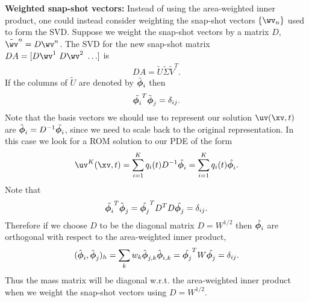 {\bf Weighted snap-shot vectors:} Instead of using the area-weighted inner product, one could instead consider weighting the
snap-shot vectors $\{ \wv_n \}$ used to form the SVD. Suppose we weight the snap-shot vectors by
a matrix $D$, $\tilde{\wv}^n=D\wv^n$. The SVD for the new snap-shot matrix $D A =[ D\wv^1~D\wv^2~\ldots]$ is
\begin{align}
   D A = \tilde{U} \tilde{\Sigma} \tilde{V}^T.
\end{align}
If the columns of $\tilde{U}$ are denoted by $\tilde{\boldsymbol{\phi}}_i$ then 
\begin{align}
   \tilde{\boldsymbol{\phi}_i} ^T \tilde{\boldsymbol{\phi}}_j = \delta_{ij} . 
\end{align}
Note that the basis vectors we should 
use to represent our solution $\uv(\xv,t)$ are $\hat{\boldsymbol{\phi}}_i = D^{-1} \tilde{\boldsymbol{\phi}_i}$,
since we need to scale back to the original representation.
In this case we look for a ROM solution to our PDE of the form
\begin{align}
   \uv^K(\xv,t) = \sum_{i=1}^K q_i(t) D^{-1} \tilde{\phiv_i} = \sum_{i=1}^K q_i(t) \hat{\phiv_i}. 
\end{align}
Note that 
\begin{align}
   \tilde{\boldsymbol{\phi}_i} ^T \tilde{\boldsymbol{\phi}}_j = \hat{\boldsymbol{\phi}_j} ^T D^T D \hat{\boldsymbol{\phi}_j} = \delta_{ij} .
\end{align}
Therefore if we choose $D$ to be the diagonal matrix $D=W^{1/2}$ then $\hat{\boldsymbol{\phi}_i}$ are orthogonal with respect to the area-weighted
inner product,
 \begin{align}
   (\hat{\boldsymbol{\phi}}_i,\hat{\boldsymbol{\phi}}_j)_h = \sum_k w_k \hat{\boldsymbol{\phi}}_{j,k} \hat{\boldsymbol{\phi}}_{i,k} = \hat{\boldsymbol{\phi}_j} ^T W \hat{\boldsymbol{\phi}_j} = \delta_{ij} .
\end{align}
Thus the mass matrix will be diagonal w.r.t. the area-weighted inner product when we weight the snap-shot vectors 
using $D=W^{1/2}$.